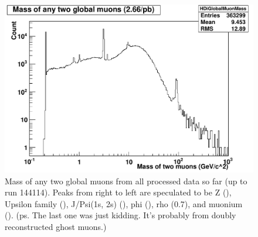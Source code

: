 \begin{figure}
\includegraphics[width=120mm]{DailyLog/6264/6264DiGlobalMuonMass_DataAll.pdf}
\caption{Mass of any two global muons from all processed data so far (up to run 144114).  Peaks from right to left are speculated to be
Z (), Upsilon family (), J/Psi(1s, 2s) (), phi (), rho (0.7), and muonium ().
(ps. The last one was just kidding.  It's probably from doubly reconstructed ghost muons.)}
\label{Figure_6264DiGlobalMuonMass_DataExceptLast}
\end{figure}





